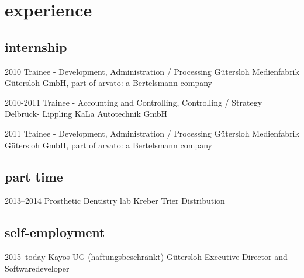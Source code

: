 \documentclass[]{friggeri-cv} %
\begin{document}

\section{experience}

\subsection{internship}

\begin{entrylist}


\entry
{2010}
{Trainee - Development, Administration / Processing}
{G\"{u}tersloh}
{Medienfabrik G\"{u}tersloh GmbH, part of arvato: a Bertelsmann company}


\entry
{2010-2011}
{Trainee - Accounting and Controlling, Controlling / Strategy}
{Delbr\"{u}ck- Lippling}
{KaLa Autotechnik GmbH}

\entry
{2011}
{Trainee - Development, Administration / Processing}
{G\"{u}tersloh}
{Medienfabrik G\"{u}tersloh GmbH, part of arvato: a Bertelsmann company}


\end{entrylist}

\subsection{part time}

\begin{entrylist}

\entry
{2013--2014}
{Prosthetic Dentistry lab Kreber}
{Trier}
{Distribution}


\end{entrylist}

\subsection{self-employment}

\begin{entrylist}

\entry
{2015--today}
{Kayos UG (haftungsbeschr\"{a}nkt)}
{G\"{u}tersloh}
{Executive Director and Softwaredeveloper}

\\ 
\end{entrylist}
\end{document}
